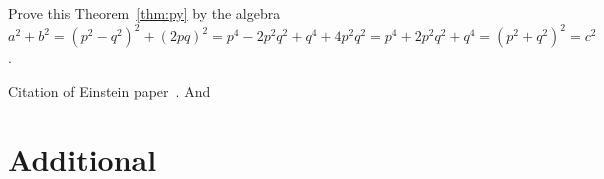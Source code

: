 \documentclass[11pt,a4paper,oldfontcommands]{memoir}
\begin{document}
Prove this Theorem~\ref{thm:py} by the algebra \(a^2+b^2 =(p^2-q^2)^2+(2pq)^2
=p^4-2p^2q^2+q^4+4p^2q^2
=p^4+2p^2q^2+q^4
=(p^2+q^2)^2 =c^2\).

\Blinddocument

Citation of Einstein paper~\cite{Einstein}. And \cite{Einstein2}

\appendix

\chapter{Additional}
\lipsum[1]



\makeatletter
\makeatother
\end{document}
